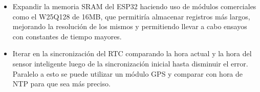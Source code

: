 \begin{itemize}
 \item Expandir la memoria SRAM del ESP32 haciendo uso de módulos comerciales como el W25Q128 de 16MB, que permitiría almacenar registros más largos, mejorando la resolución de los mismos y permitiendo llevar a cabo ensayos con constantes de tiempo mayores.
 
 \item Iterar en la sincronización del RTC comparando la hora actual y la hora del sensor inteligente luego de la sincronización inicial hasta disminuir el error. Paralelo a esto se puede utilizar un módulo GPS y comparar con hora de NTP para que sea más preciso.
\end{itemize}